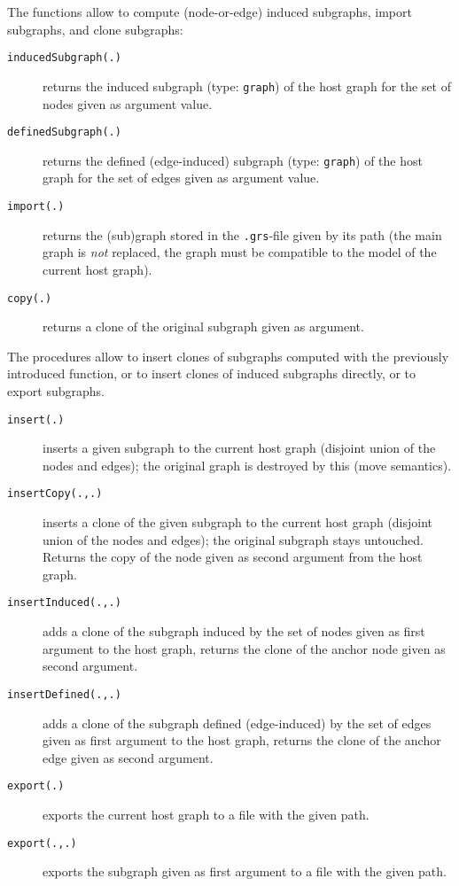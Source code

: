 The functions allow to compute (node-or-edge) induced subgraphs, import subgraphs, and clone subgraphs:

\begin{description}
\item[\texttt{inducedSubgraph(.)}] returns the induced subgraph (type: \texttt{graph}) of the host graph for the set of nodes given as argument value.
\item[\texttt{definedSubgraph(.)}] returns the defined (edge-induced) subgraph (type: \texttt{graph}) of the host graph for the set of edges given as argument value.
\item[\texttt{import(.)}] returns the (sub)graph stored in the \texttt{.grs}-file given by its path (the main graph is \emph{not} replaced, the graph must be compatible to the model of the current host graph).
\item[\texttt{copy(.)}] returns a clone of the original subgraph given as argument.
\end{description}

The procedures allow to insert clones of subgraphs computed with the previously introduced function,
or to insert clones of induced subgraphs directly,
or to export subgraphs.

\begin{description}
\item[\texttt{insert(.)}] inserts a given subgraph to the current host graph (disjoint union of the nodes and edges); the original graph is destroyed by this (move semantics).
\item[\texttt{insertCopy(.,.)}] inserts a clone of the given subgraph to the current host graph (disjoint union of the nodes and edges); the original subgraph stays untouched. Returns the copy of the node given as second argument from the host graph.
\item[\texttt{insertInduced(.,.)}] adds a clone of the subgraph induced by the set of nodes given as first argument to the host graph, returns the clone of the anchor node given as second argument.
\item[\texttt{insertDefined(.,.)}] adds a clone of the subgraph defined (edge-induced) by the set of edges given as first argument to the host graph, returns the clone of the anchor edge given as second argument.
\item[\texttt{export(.)}] exports the current host graph to a file with the given path.
\item[\texttt{export(.,.)}] exports the subgraph given as first argument to a file with the given path.
\end{description}


